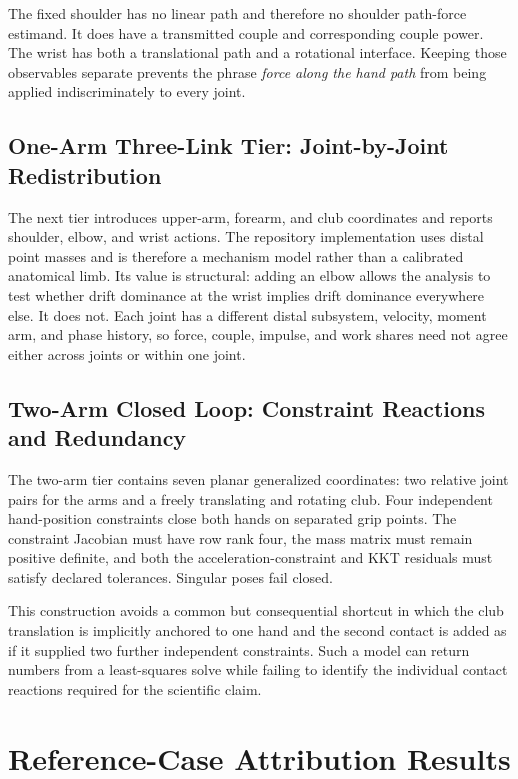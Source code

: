 \documentclass[
  letterpaper,
]{report}
\begin{document}
The fixed shoulder has no linear path and therefore no shoulder
path-force estimand. It does have a transmitted couple and corresponding
couple power. The wrist has both a translational path and a rotational
interface. Keeping those observables separate prevents the phrase
\emph{force along the hand path} from being applied indiscriminately to
every joint.

\subsection{One-Arm Three-Link Tier: Joint-by-Joint
Redistribution}\label{sec-attribution-one-arm}

The next tier introduces upper-arm, forearm, and club coordinates and
reports shoulder, elbow, and wrist actions. The repository
implementation uses distal point masses and is therefore a mechanism
model rather than a calibrated anatomical limb. Its value is structural:
adding an elbow allows the analysis to test whether drift dominance at
the wrist implies drift dominance everywhere else. It does not. Each
joint has a different distal subsystem, velocity, moment arm, and phase
history, so force, couple, impulse, and work shares need not agree
either across joints or within one joint.

\subsection{Two-Arm Closed Loop: Constraint Reactions and
Redundancy}\label{sec-attribution-two-arm}

The two-arm tier contains seven planar generalized coordinates: two
relative joint pairs for the arms and a freely translating and rotating
club. Four independent hand-position constraints close both hands on
separated grip points. The constraint Jacobian must have row rank four,
the mass matrix must remain positive definite, and both the
acceleration-constraint and KKT residuals must satisfy declared
tolerances. Singular poses fail closed.

This construction avoids a common but consequential shortcut in which
the club translation is implicitly anchored to one hand and the second
contact is added as if it supplied two further independent constraints.
Such a model can return numbers from a least-squares solve while failing
to identify the individual contact reactions required for the scientific
claim.

\section{Reference-Case Attribution
Results}\label{sec-attribution-reference-results}
\end{document}
